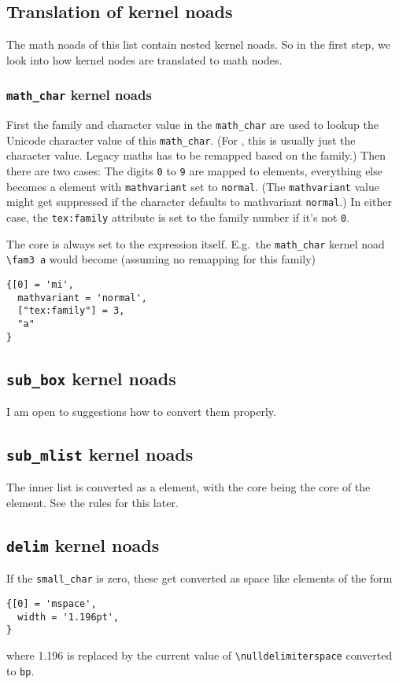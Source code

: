\documentclass{article}
\begin{document}
\subsection{Translation of kernel noads}
The math noads of this list contain nested kernel noads. So in the first step, we look into how kernel nodes are translated to math nodes.

\subsubsection{\texttt{math_char} kernel noads}
First the family and character value in the \texttt{math_char} are used to lookup the Unicode character value of this \texttt{math_char}.
(For , this is usually just the character value. Legacy maths has to be remapped based on the family.)
Then there are two cases: The digits \texttt{0} to \texttt{9} are mapped to  elements, everything else becomes a  element with \texttt{mathvariant} set to \texttt{normal}.
(The \texttt{mathvariant} value might get suppressed if the character defaults to mathvariant \texttt{normal}.)
In either case, the \texttt{tex:family} attribute is set to the family number if it's not \texttt{0}.

The core is always set to the expression itself. E.g.\ the \texttt{math_char} kernel noad \verb+\fam3 a+ would become (assuming no remapping for this family)
\begin{verbatim}
{[0] = 'mi',
  mathvariant = 'normal',
  ["tex:family"] = 3,
  "a"
}
\end{verbatim}

\subsection{\texttt{sub_box} kernel noads}
I am open to suggestions how to convert them properly.

\subsection{\texttt{sub_mlist} kernel noads}
The inner list is converted as a  element, with the core being the core of the  element. See the rules for this later.

\subsection{\texttt{delim} kernel noads}
If the \texttt{small_char} is zero, these get converted as space like elements of the form
\begin{verbatim}
{[0] = 'mspace',
  width = '1.196pt',
}
\end{verbatim}
where 1.196 is replaced by the current value of \verb+\nulldelimiterspace+ converted to \texttt{bp}.
\end{document}
